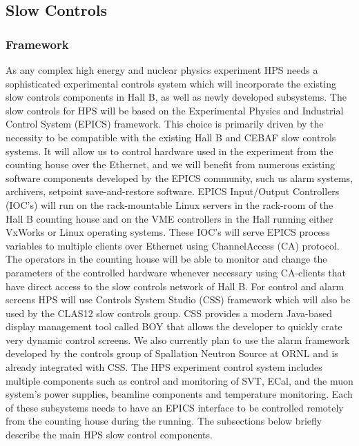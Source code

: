 
\subsection{Slow Controls}

\subsubsection{Framework}
\label{sec:ctrls:framework}
As any complex high energy and nuclear physics experiment HPS needs a sophisticated experimental controls 
system which will incorporate the existing slow controls components in Hall B, as well as 
newly developed subsystems.  The slow controls for HPS  will be based on the 
Experimental Physics and Industrial Control System (EPICS) framework. This choice is primarily 
driven by the necessity to be compatible with the existing Hall B and CEBAF slow controls systems. 
It will allow us to control  hardware used in the experiment from the counting house 
over the Ethernet, and we will benefit from numerous existing software components developed by the EPICS 
community, such us alarm systems, archivers, setpoint save-and-restore software. EPICS Input/Output 
Controllers (IOC's)  will run on the rack-mountable 
Linux servers in the rack-room of the Hall B counting house and on the VME controllers in the Hall 
running either VxWorks or Linux operating systems. These IOC's will serve EPICS process variables 
to multiple clients over Ethernet using ChannelAccess (CA) protocol. The operators in the counting house 
will be able to monitor and change the parameters of the controlled hardware whenever necessary using 
CA-clients that have direct access to the slow controls network of Hall B.  
For control and alarm screens HPS will use Controls System Studio (CSS) framework which will also be  
used by the CLAS12 slow controls group. CSS provides a modern Java-based display management tool called 
BOY that allows the developer to quickly crate very dynamic control screens. We also currently plan to use 
the alarm framework developed by the controls group of Spallation Neutron Source at ORNL and is already integrated 
with CSS. The HPS experiment control system includes multiple components such as control and monitoring of  SVT, 
ECal, and the muon system's power supplies, beamline components and temperature monitoring. Each of 
these subsystems needs to have an EPICS interface to be controlled remotely from the counting house during 
the running. The subsections below briefly describe the main HPS slow control components. 


